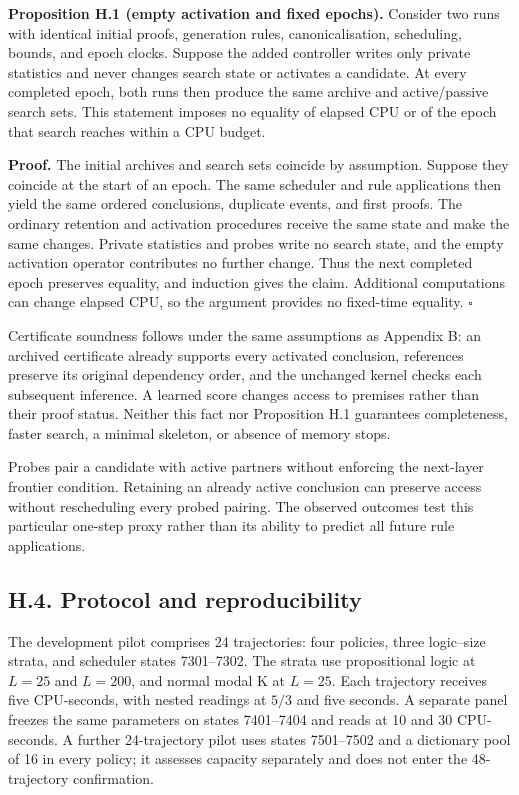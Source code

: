 \documentclass[pdflatex,sn-basic,Numbered]{sn-jnl}
\begin{document}
\textbf{Proposition H.1 (empty activation and fixed epochs).} Consider two runs with identical initial proofs, generation rules, canonicalisation, scheduling, bounds, and epoch clocks. Suppose the added controller writes only private statistics and never changes search state or activates a candidate. At every completed epoch, both runs then produce the same archive and active/passive search sets. This statement imposes no equality of elapsed CPU or of the epoch that search reaches within a CPU budget.

\textbf{Proof.} The initial archives and search sets coincide by assumption. Suppose they coincide at the start of an epoch. The same scheduler and rule applications then yield the same ordered conclusions, duplicate events, and first proofs. The ordinary retention and activation procedures receive the same state and make the same changes. Private statistics and probes write no search state, and the empty activation operator contributes no further change. Thus the next completed epoch preserves equality, and induction gives the claim. Additional computations can change elapsed CPU, so the argument provides no fixed-time equality. \(\square\)

Certificate soundness follows under the same assumptions as Appendix B: an archived certificate already supports every activated conclusion, references preserve its original dependency order, and the unchanged kernel checks each subsequent inference. A learned score changes access to premises rather than their proof status. Neither this fact nor Proposition H.1 guarantees completeness, faster search, a minimal skeleton, or absence of memory stops.

Probes pair a candidate with active partners without enforcing the next-layer frontier condition. Retaining an already active conclusion can preserve access without rescheduling every probed pairing. The observed outcomes test this particular one-step proxy rather than its ability to predict all future rule applications.

\subsection*{H.4. Protocol and reproducibility}\label{h.4.-protocol-and-reproducibility}

The development pilot comprises 24 trajectories: four policies, three logic--size strata, and scheduler states 7301--7302. The strata use propositional logic at \(L = 25\) and \(L = 200\), and normal modal K at \(L = 25\). Each trajectory receives five CPU-seconds, with nested readings at \(5/3\) and five seconds. A separate panel freezes the same parameters on states 7401--7404 and reads at 10 and 30 CPU-seconds. A further 24-trajectory pilot uses states 7501--7502 and a dictionary pool of 16 in every policy; it assesses capacity separately and does not enter the 48-trajectory confirmation.
\end{document}
